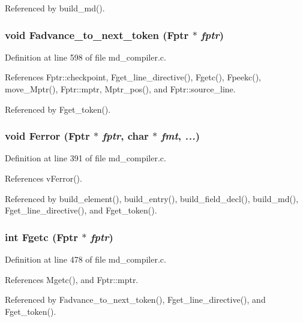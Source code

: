 Referenced by build\_\-md().
\subsubsection{\setlength{\rightskip}{0pt plus 5cm}void Fadvance\_\-to\_\-next\_\-token (\bf{Fptr} $\ast$ {\em fptr})}\label{md__compiler_8h_de728546c62e9c27434f5e16b9581308}




Definition at line 598 of file md\_\-compiler.c.

References Fptr::checkpoint, Fget\_\-line\_\-directive(), Fgetc(), Fpeekc(), move\_\-Mptr(), Fptr::mptr, Mptr\_\-pos(), and Fptr::source\_\-line.

Referenced by Fget\_\-token().
\subsubsection{\setlength{\rightskip}{0pt plus 5cm}void Ferror (\bf{Fptr} $\ast$ {\em fptr}, char $\ast$ {\em fmt},  {\em ...})}\label{md__compiler_8h_761c4386743ac261985b813ab1a8040c}




Definition at line 391 of file md\_\-compiler.c.

References v\-Ferror().

Referenced by build\_\-element(), build\_\-entry(), build\_\-field\_\-decl(), build\_\-md(), Fget\_\-line\_\-directive(), and Fget\_\-token().
\subsubsection{\setlength{\rightskip}{0pt plus 5cm}int Fgetc (\bf{Fptr} $\ast$ {\em fptr})}\label{md__compiler_8h_50725b05de9292d7eb2eaa36a6d6fdcb}




Definition at line 478 of file md\_\-compiler.c.

References Mgetc(), and Fptr::mptr.

Referenced by Fadvance\_\-to\_\-next\_\-token(), Fget\_\-line\_\-directive(), and Fget\_\-token().

